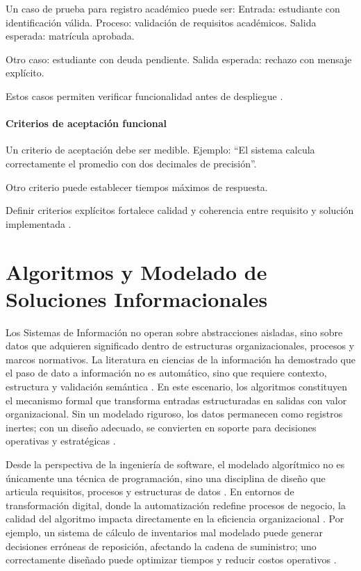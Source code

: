 \documentclass[12pt,twoside]{book}
\begin{document}
						Un caso de prueba para registro académico puede ser:  
						Entrada: estudiante con identificación válida.  
						Proceso: validación de requisitos académicos.  
						Salida esperada: matrícula aprobada.
						
						Otro caso: estudiante con deuda pendiente.  
						Salida esperada: rechazo con mensaje explícito.
						
						Estos casos permiten verificar funcionalidad antes de despliegue \cite{Pressman2019Software}.
						
						\subsubsection{Criterios de aceptación funcional}
						
						Un criterio de aceptación debe ser medible. Ejemplo: “El sistema calcula correctamente el promedio con dos decimales de precisión”.
						
						Otro criterio puede establecer tiempos máximos de respuesta.
						
						Definir criterios explícitos fortalece calidad y coherencia entre requisito y solución implementada \cite{ISOIECIEEE2018Requirements,SWEBOK2025Guide}.
	
		\chapter{Algoritmos y Modelado de Soluciones Informacionales}
			\noindent
			Los Sistemas de Información no operan sobre abstracciones aisladas, sino sobre datos que adquieren significado dentro de estructuras organizacionales, procesos y marcos normativos. La literatura en ciencias de la información ha demostrado que el paso de dato a información no es automático, sino que requiere contexto, estructura y validación semántica \cite{Floridi2003Data,Zins2007Conceptual,Gellert2022Comparing}. En este escenario, los algoritmos constituyen el mecanismo formal que transforma entradas estructuradas en salidas con valor organizacional. Sin un modelado riguroso, los datos permanecen como registros inertes; con un diseño adecuado, se convierten en soporte para decisiones operativas y estratégicas \cite{Horvitz2020Data}.
			
			Desde la perspectiva de la ingeniería de software, el modelado algorítmico no es únicamente una técnica de programación, sino una disciplina de diseño que articula requisitos, procesos y estructuras de datos \cite{Pressman2019Software,Sommerville2015Software}. En entornos de transformación digital, donde la automatización redefine procesos de negocio, la calidad del algoritmo impacta directamente en la eficiencia organizacional \cite{Verhoef2021Digital,Bitkowska2022Importance}. Por ejemplo, un sistema de cálculo de inventarios mal modelado puede generar decisiones erróneas de reposición, afectando la cadena de suministro; uno correctamente diseñado puede optimizar tiempos y reducir costos operativos \cite{Atieh2025Impact}.
			
\end{document}

